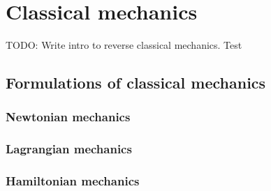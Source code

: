 \chapter{Classical mechanics}

TODO: Write intro to reverse classical mechanics. Test

\section{Formulations of classical mechanics}

\subsection{Newtonian mechanics}

\subsection{Lagrangian mechanics}

\subsection{Hamiltonian mechanics}